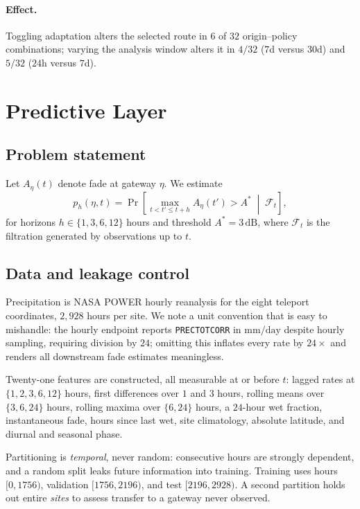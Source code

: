 \documentclass[10pt,twocolumn]{article}
\newcommand{\dB}{\,\mathrm{dB}}
\begin{document}
\paragraph{Effect.} Toggling adaptation alters the selected route in $6$ of $32$
origin--policy combinations; varying the analysis window alters it in $4/32$
($7$d versus $30$d) and $5/32$ ($24$h versus $7$d).

\section{Predictive Layer}
\label{sec:predict}

\subsection{Problem statement}

Let $A_{\eta}(t)$ denote fade at gateway $\eta$. We estimate
\begin{equation}
p_{h}(\eta,t)=\Pr\!\left[\max_{t<t'\le t+h} A_{\eta}(t') > A^{\ast}
\;\middle|\; \mathcal{F}_{t}\right],
\end{equation}
for horizons $h\in\{1,3,6,12\}$ hours and threshold $A^{\ast}=3\dB$, where
$\mathcal{F}_{t}$ is the filtration generated by observations up to $t$.

\subsection{Data and leakage control}

Precipitation is NASA POWER hourly reanalysis for the eight teleport
coordinates, $2{,}928$ hours per site. We note a unit convention that is easy to
mishandle: the hourly endpoint reports \texttt{PRECTOTCORR} in
$\mathrm{mm/day}$ despite hourly sampling, requiring division by $24$; omitting
this inflates every rate by $24\times$ and renders all downstream fade estimates
meaningless.

Twenty-one features are constructed, all measurable at or before $t$: lagged
rates at $\{1,2,3,6,12\}$ hours, first differences over $1$ and $3$ hours,
rolling means over $\{3,6,24\}$ hours, rolling maxima over $\{6,24\}$ hours, a
$24$-hour wet fraction, instantaneous fade, hours since last wet, site
climatology, absolute latitude, and diurnal and seasonal phase.

Partitioning is \emph{temporal}, never random: consecutive hours are strongly
dependent, and a random split leaks future information into training. Training
uses hours $[0,1756)$, validation $[1756,2196)$, and test $[2196,2928)$. A
second partition holds out entire \emph{sites} to assess transfer to a gateway
never observed.
\end{document}
